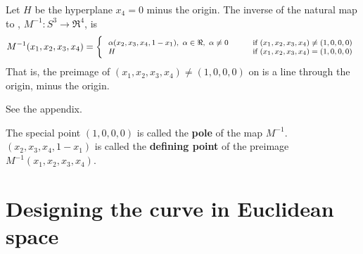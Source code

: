 \begin{theorem}
\label{thm:inverse}
Let $H$ be the hyperplane $x_4 = 0$ minus the origin.
The inverse of the natural map to , $M^{-1}: S^3 \rightarrow \Re^4$, is
\[ 
\footnotesize{
	M^{-1}(x_1,x_2,x_3,x_4) =
	\left\{ 
	\begin{tabular}{ll}
		$\alpha(x_2,x_3,x_4,1-x_1),\ \alpha \in \Re,\ \alpha \neq 0 \hspace{.2in}$
		  & $\mbox{if } (x_1,x_2,x_3,x_4) \neq (1,0,0,0)$\\
		$H$ & $\mbox{if } (x_1,x_2,x_3,x_4) = (1,0,0,0)$
	\end{tabular}
	\right.
}
\]
That is, the preimage of $(x_1,x_2,x_3,x_4) \neq (1,0,0,0)$ on 
is a line through the origin, minus the origin.
\end{theorem}
\prf See the appendix. \QED
%
\begin{defn2}
\label{defn:pole}
The special point $(1,0,0,0)$ is called the {\bf pole} of the map $M^{-1}$.\\
$(x_2,x_3,x_4,1-x_1)$ is called the {\bf defining point} of the preimage 
$M^{-1}(x_1,x_2,x_3,x_4)$.
\end{defn2}




\section{Designing the curve in Euclidean space}
\label{sec:eucdesign}

